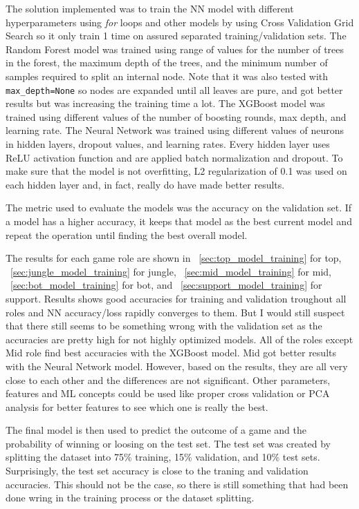 \documentclass[12pt, a4paper]{article}
\begin{document}
The solution implemented was to train the NN model with different hyperparameters using \emph{for} loops and other models by using Cross Validation Grid Search so it only train 1 time on assured separated training/validation sets.
The Random Forest model was trained using range of values for the number of trees in the forest, the maximum depth of the trees, and the minimum number of samples required to split an internal node.
Note that it was also tested with \texttt{max\_depth=None} so nodes are expanded until all leaves are pure, and got better results but was increasing the training time a lot.
The XGBoost model was trained using different values of the number of boosting rounds, max depth, and learning rate.
The Neural Network was trained using different values of neurons in hidden layers, dropout values, and learning rates.
Every hidden layer uses ReLU activation function and are applied batch normalization and dropout.
To make sure that the model is not overfitting, L2 regularization of 0.1 was used on each hidden layer and, in fact, really do have made better results.

The metric used to evaluate the models was the accuracy on the validation set.
If a model has a higher accuracy, it keeps that model as the best current model and repeat the operation until finding the best overall model.

The results for each game role are shown in \appendixname~\ref{sec:top_model_training} for top, \appendixname~\ref{sec:jungle_model_training} for jungle, \appendixname~\ref{sec:mid_model_training} for mid, \appendixname~\ref{sec:bot_model_training} for bot, and \appendixname~\ref{sec:support_model_training} for support.
Results shows good accuracies for training and validation troughout all roles and NN accuracy/loss rapidly converges to them.
But I would still suspect that there still seems to be something wrong with the validation set as the accuracies are pretty high for not highly optimized models.
All of the roles except Mid role find best accuracies with the XGBoost model.
Mid got better results with the Neural Network model.
However, based on the results, they are all very close to each other and the differences are not significant.
Other parameters, features and ML concepts could be used like proper cross validation or PCA analysis for better features to see which one is really the best.

The final model is then used to predict the outcome of a game and the probability of winning or loosing on the test set.
The test set was created by splitting the dataset into 75\% training, 15\% validation, and 10\% test sets.
Surprisingly, the test set accuracy is close to the traning and validation accuracies.
This should not be the case, so there is still something that had been done wring in the training process or the dataset splitting.
\end{document}
